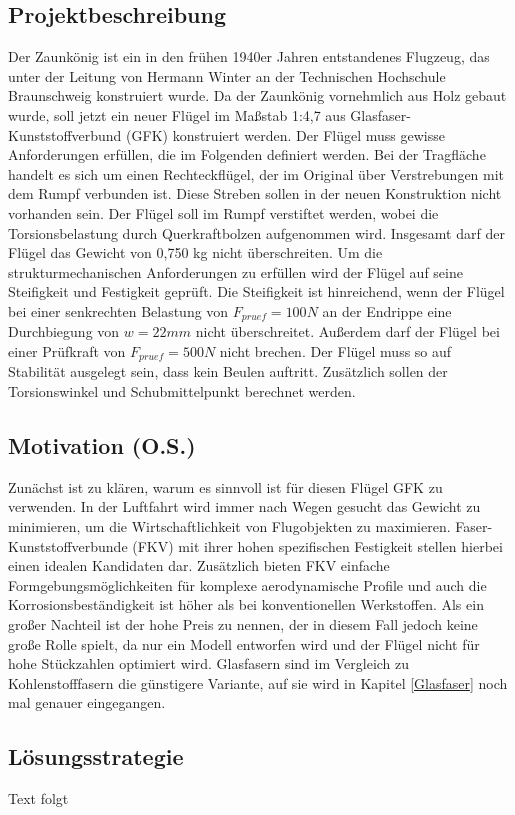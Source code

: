 
\subsection{Projektbeschreibung}
Der Zaunkönig ist ein in den frühen 1940er Jahren entstandenes Flugzeug, das unter der Leitung von Hermann Winter an der Technischen Hochschule Braunschweig konstruiert wurde. Da der Zaunkönig vornehmlich aus Holz gebaut wurde, soll jetzt ein neuer Flügel im Maßstab 1:4,7 aus Glasfaser-Kunststoffverbund (GFK) konstruiert werden. Der Flügel muss gewisse Anforderungen erfüllen, die im Folgenden definiert werden.
Bei der Tragfläche handelt es sich um einen Rechteckflügel, der im Original über Verstrebungen mit dem Rumpf verbunden ist. Diese Streben sollen in der neuen Konstruktion nicht vorhanden sein. Der Flügel soll im Rumpf verstiftet werden, wobei die Torsionsbelastung durch Querkraftbolzen aufgenommen wird. Insgesamt darf der Flügel das Gewicht von 0,750 kg nicht überschreiten.
Um die strukturmechanischen Anforderungen zu erfüllen wird der Flügel auf seine Steifigkeit und Festigkeit geprüft. Die Steifigkeit ist hinreichend, wenn der Flügel bei einer senkrechten Belastung von $ F_{pruef}=100N $ an der Endrippe eine Durchbiegung von $ w=22mm $ nicht überschreitet. Außerdem darf der Flügel bei einer Prüfkraft von $ F_{pruef}=500N $ nicht brechen. Der Flügel muss so auf Stabilität ausgelegt sein, dass kein Beulen auftritt. Zusätzlich sollen der Torsionswinkel und Schubmittelpunkt berechnet werden.
\subsection{Motivation (O.S.)}
Zunächst ist zu klären, warum es sinnvoll ist für diesen Flügel GFK zu verwenden. In der Luftfahrt wird immer nach Wegen gesucht das Gewicht zu minimieren, um die Wirtschaftlichkeit von Flugobjekten zu maximieren. Faser-Kunststoffverbunde (FKV) mit ihrer hohen spezifischen Festigkeit stellen hierbei einen idealen Kandidaten dar. Zusätzlich bieten FKV einfache Formgebungsmöglichkeiten für komplexe aerodynamische Profile und auch die Korrosionsbeständigkeit ist höher als bei konventionellen Werkstoffen. Als ein großer Nachteil ist der hohe Preis zu nennen, der in diesem Fall jedoch keine große Rolle spielt, da nur ein Modell entworfen wird und der Flügel nicht für hohe Stückzahlen optimiert wird. Glasfasern sind im Vergleich zu Kohlenstofffasern die günstigere Variante, auf sie wird in Kapitel \ref{Glasfaser} noch mal genauer eingegangen.
\subsection{Lösungsstrategie}
Text folgt